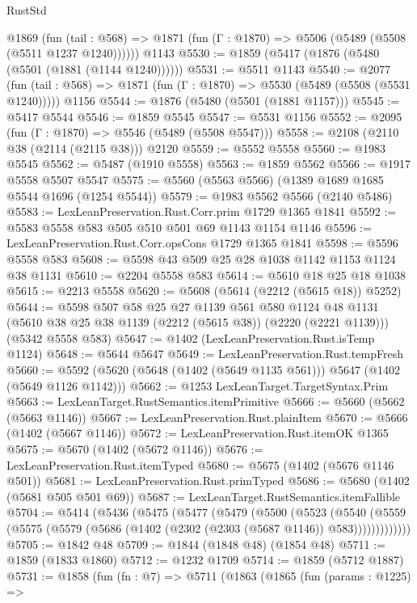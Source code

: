 \begin{lexlean}{RustStd}
\begin{coremodule}
    @1869
      (fun (tail : @568) => @1871 (fun (Γ : @1870) => @5506 (@5489 (@5508 (@5511 @1237 @1240))))))
    @1143
@5530 := @1859 (@5417 (@1876 (@5480 (@5501 (@1881 (@1144 @1240))))))
@5531 := @5511 @1143
@5540 := @2077
    (fun (tail : @568) => @1871 (fun (Γ : @1870) => @5530 (@5489 (@5508 (@5531 @1240)))))
    @1156
@5544 := @1876 (@5480 (@5501 (@1881 @1157)))
@5545 := @5417 @5544
@5546 := @1859 @5545
@5547 := @5531 @1156
@5552 := @2095 (fun (Γ : @1870) => @5546 (@5489 (@5508 @5547)))
@5558 := @2108 (@2110 @38 (@2114 (@2115 @38))) @2120
@5559 := @5552 @5558
@5560 := @1983 @5545
@5562 := @5487 (@1910 @5558)
@5563 := @1859 @5562
@5566 := @1917 @5558 @5507 @5547
@5575 := @5560 (@5563 @5566) (@1389 @1689 @1685 @5544 @1696 (@1254 @5544))
@5579 := @1983 @5562 @5566 (@2140 @5486)
@5583 := LexLeanPreservation.Rust.Corr.prim @1729 @1365 @1841
@5592 := @5583 @5558 @583 @505 @510 @501 @69 @1143 @1154 @1146
@5596 := LexLeanPreservation.Rust.Corr.opsCons @1729 @1365 @1841
@5598 := @5596 @5558 @583
@5608 := @5598 @43 @509 @25 @28 @1038 @1142 @1153 @1124 @38 @1131
@5610 := @2204 @5558 @583
@5614 := @5610 @18 @25 @18 @1038
@5615 := @2213 @5558
@5620 := @5608 (@5614 (@2212 (@5615 @18)) @5252)
@5644 := @5598
    @507
    @58
    @25
    @27
    @1139
    @561
    @580
    @1124
    @48
    @1131
    (@5610 @38 @25 @38 @1139 (@2212 (@5615 @38)) (@2220 (@2221 @1139)))
    (@5342 @5558 @583)
@5647 := @1402 (LexLeanPreservation.Rust.isTemp @1124)
@5648 := @5644 @5647
@5649 := LexLeanPreservation.Rust.tempFresh
@5660 := @5592 (@5620 (@5648 (@1402 (@5649 @1135 @561))) @5647 (@1402 (@5649 @1126 @1142)))
@5662 := @1253 LexLeanTarget.TargetSyntax.Prim
@5663 := LexLeanTarget.RustSemantics.itemPrimitive
@5666 := @5660 (@5662 (@5663 @1146))
@5667 := LexLeanPreservation.Rust.plainItem
@5670 := @5666 (@1402 (@5667 @1146))
@5672 := LexLeanPreservation.Rust.itemOK @1365
@5675 := @5670 (@1402 (@5672 @1146))
@5676 := LexLeanPreservation.Rust.itemTyped
@5680 := @5675 (@1402 (@5676 @1146 @501))
@5681 := LexLeanPreservation.Rust.primTyped
@5686 := @5680 (@1402 (@5681 @505 @501 @69))
@5687 := LexLeanTarget.RustSemantics.itemFallible
@5704 := @5414
    (@5436
      (@5475
        (@5477
          (@5479
            (@5500
              (@5523
                (@5540
                  (@5559 (@5575 (@5579 (@5686 (@1402 (@2302 (@2303 (@5687 @1146)) @583)))))))))))))
@5705 := @1842 @48
@5709 := @1844 (@1848 @48) (@1854 @48)
@5711 := @1859 (@1833 @1860)
@5712 := @1232 @1709
@5714 := @1859 (@5712 @1887)
@5731 := @1858
    (fun (fn : @7) =>
    @5711
      (@1863
        (@1865
          (fun (params : @1225) =>

\end{coremodule}
\end{lexlean}
